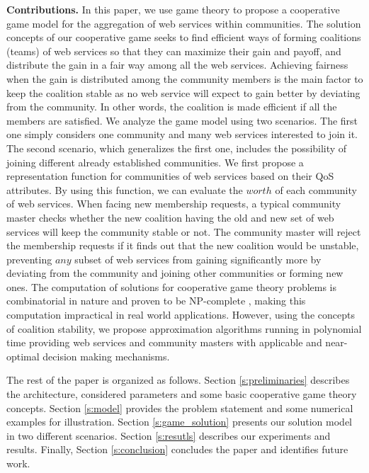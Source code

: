 \documentclass[10pt,journal,cspaper,compsoc]{IEEEtran}
\begin{document}
\textbf{Contributions.} In this paper, we use game theory to
propose a cooperative game model for the aggregation of web
services within communities. The solution concepts of our
cooperative game seeks to find efficient ways of forming
coalitions (teams) of web services so that they can maximize their
gain and payoff, and distribute the gain in a fair way among all
the web services. Achieving fairness when the gain is distributed
among the community members is the main factor to keep the
coalition stable as no web service will expect to gain better by
deviating from the community. In other words, the coalition is
made efficient if all the members are satisfied. We analyze the
game model using two scenarios. The first one simply considers one
community and many web services interested to join it. The second
scenario, which generalizes the first one, includes the
possibility of joining different already established communities.
We first propose a representation function for communities of web
services based on their QoS attributes. By using this function, we
can evaluate the $worth$ of each community of web services. When
facing new membership requests, a typical community master checks
whether the new coalition having the old and new set of web
services will keep the community stable or not. The community
master will reject the membership requests if it finds out that
the new coalition would be unstable, preventing $any$ subset of
web services from gaining significantly more by deviating from the
community and joining other communities or forming new ones. The
computation of solutions for cooperative game theory problems is
combinatorial in nature and proven to be NP-complete
\cite{Algorithmic}, making this computation impractical in real
world applications. However, using the concepts of coalition
stability, we propose approximation algorithms running in
polynomial time providing web services and community masters with
applicable and near-optimal decision making mechanisms.

The rest of the paper is organized as follows. Section
\ref{s:preliminaries} describes the architecture, considered
parameters and some basic cooperative game theory concepts.
Section \ref{s:model} provides the problem statement and some
numerical examples for illustration. Section \ref{s:game_solution}
presents our solution model in two different scenarios. Section
\ref{s:resutls} describes our experiments and results. Finally,
Section \ref{s:conclusion} concludes the paper and identifies
future work.
\end{document}
